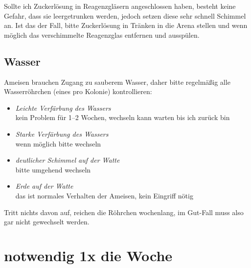 Sollte ich Zuckerlösung in Reagenzgläsern angeschlossen haben,
besteht keine Gefahr, dass sie leergetrunken werden, jedoch setzen diese sehr schnell Schimmel an.
Ist das der Fall, bitte Zuckerlösung in Tränken in die Arena stellen und
wenn möglich das verschimmelte Reagenzglas entfernen und ausspülen.

\subsection{Wasser}
Ameisen brauchen Zugang zu sauberem Wasser, daher bitte regelmäßig alle Wasserröhrchen
(eines pro Kolonie) kontrollieren:

\begin{itemize}
  \item\textit{Leichte Verfärbung des Wassers} \\
  kein Problem für 1--2 Wochen, wechseln kann warten bis ich zurück bin
  \item\textit{Starke Verfärbung des Wassers} \\
  wenn möglich bitte wechseln
  \item\textit{deutlicher Schimmel auf der Watte} \\
  bitte umgehend wechseln
  \item\textit{Erde auf der Watte} \\
  das ist normales Verhalten der Ameisen, kein Eingriff nötig
\end{itemize}

Tritt nichts davon auf, reichen die Röhrchen wochenlang, im Gut-Fall muss also gar nicht gewechselt werden.

\section{notwendig 1x die Woche}

